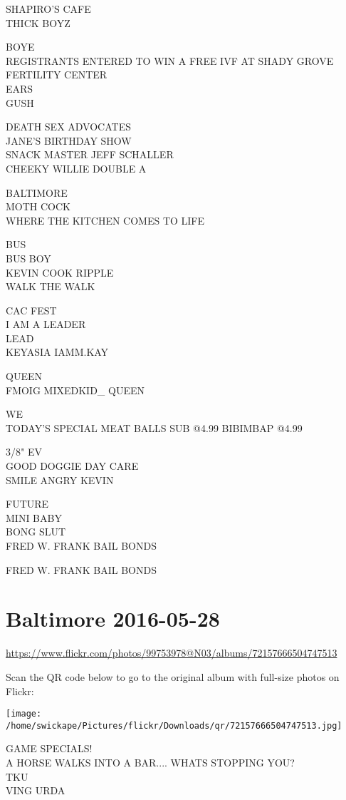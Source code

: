 \documentclass[10pt,letterpaper]{article}
\begin{document}
SHAPIRO'S CAFE\\
THICK BOYZ

BOYE\\
REGISTRANTS ENTERED TO WIN A FREE IVF AT SHADY GROVE FERTILITY CENTER\\
EARS\\
GUSH

DEATH SEX ADVOCATES\\
JANE'S BIRTHDAY SHOW\\
SNACK MASTER JEFF SCHALLER\\
CHEEKY WILLIE DOUBLE A

BALTIMORE\\
MOTH COCK\\
WHERE THE KITCHEN COMES TO LIFE

BUS\\
BUS BOY\\
KEVIN COOK RIPPLE\\
WALK THE WALK

CAC FEST\\
I AM A LEADER\\
LEAD\\
KEYASIA IAMM.KAY

QUEEN\\
FMOIG MIXEDKID\_ QUEEN

WE\\
TODAY'S SPECIAL MEAT BALLS SUB @4.99 BIBIMBAP @4.99

3/8" EV\\
GOOD DOGGIE DAY CARE\\
SMILE ANGRY KEVIN

FUTURE\\
MINI BABY\\
BONG SLUT\\
FRED W. FRANK BAIL BONDS

FRED W. FRANK BAIL BONDS


\section*{Baltimore 2016-05-28}

\url{https://www.flickr.com/photos/99753978@N03/albums/72157666504747513}

Scan the QR code below to go to the original album with full-size photos on Flickr:

\texttt{[image: /home/swickape/Pictures/flickr/Downloads/qr/72157666504747513.jpg]}


GAME SPECIALS!\\
A HORSE WALKS INTO A BAR.... WHATS STOPPING YOU?\\
TKU\\
VING URDA
\end{document}
